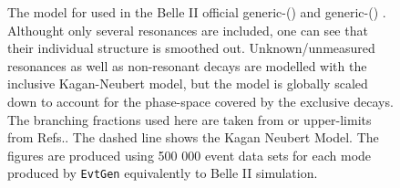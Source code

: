 \begin{figure}[htbp!]
    \caption{\label{fig:generic_Xs_model} The model for \BtoXsgamma used in the Belle II official generic-\Bp () and generic-\Bz () \MC.
    Althought only several resonances are included, one can see that their individual structure is smoothed out.
    Unknown/unmeasured resonances as well as non-resonant decays are modelled with the inclusive Kagan-Neubert model, but the model is globally scaled down to account for the phase-space covered by the exclusive decays.
    The branching fractions used here are taken from  or upper-limits from Refs.\cite{Workman:2022ynf,Amhis:2022mac}.
    The dashed line shows the Kagan Neubert Model.
    The figures are produced using 500 000 event data sets for each mode produced by \texttt{EvtGen} equivalently to Belle II simulation.
    }    
\end{figure}

